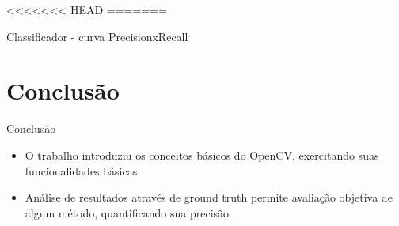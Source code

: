 \documentclass[
    style=paintings,
    paper=screen,
    blackslide,
    nopagebreaks,
    fleqn
]{powerdot}
\begin{document}
<<<<<<< HEAD
=======



\begin{slide}{Classificador - curva PrecisionxRecall}

\end{slide}


\section[slide=false]{Conclusão}
\begin{slide}{Conclusão}
\begin{itemize}[type=1]
\item <1-> O trabalho introduziu os conceitos básicos do OpenCV, exercitando suas funcionalidades básicas
\item <2-> Análise de resultados através de ground truth permite avaliação objetiva de algum método, quantificando sua precisão
\end{itemize}
\end{slide}

%
%
\end{document}
